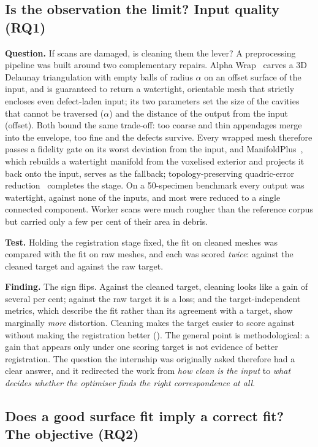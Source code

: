 \subsection{Is the observation the limit? Input quality (RQ1)}
\label{sec:prep-null}

\textbf{Question.} If scans are damaged, is cleaning them the lever? A
preprocessing pipeline was built around two complementary repairs. Alpha
Wrap~\cite{alphawrap} carves a 3D Delaunay triangulation with empty balls of
radius $\alpha$ on an offset surface of the input, and is guaranteed to return a
watertight, orientable mesh that strictly encloses even defect-laden input; its
two parameters set the size of the cavities that cannot be traversed ($\alpha$)
and the distance of the output from the input (offset). Both bound the same
trade-off: too coarse and thin appendages merge into the envelope, too fine and
the defects survive. Every wrapped mesh therefore passes a fidelity gate on its
worst deviation from the input, and ManifoldPlus~\cite{manifoldplus}, which
rebuilds a watertight manifold from the voxelised exterior and projects it back
onto the input, serves as the fallback; topology-preserving quadric-error
reduction~\cite{qem} completes the stage. On a 50-specimen benchmark every output was
watertight, against none of the inputs, and most were reduced to a single
connected component. Worker scans were much rougher than the reference corpus
but carried only a few per cent of their area in debris.

\textbf{Test.} Holding the registration stage fixed, the fit on cleaned meshes
was compared with the fit on raw meshes, and each was scored \emph{twice}:
against the cleaned target and against the raw target.

\textbf{Finding.} The sign flips. Against the cleaned target, cleaning looks
like a gain of several per cent; against the raw target it is a loss; and
the target-independent metrics, which describe the fit rather than its
agreement with a target, show marginally \emph{more} distortion. Cleaning makes
the target easier to score against without making the registration better
(). The general point is methodological: a gain that appears only under
one scoring target is not evidence of better registration. The question the
internship was originally asked therefore had a clear answer, and it
redirected the work from \emph{how clean is the input} to \emph{what decides
whether the optimiser finds the right correspondence at all}.

\subsection{Does a good surface fit imply a correct fit? The objective (RQ2)}
\label{sec:geometric-agreement}

